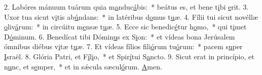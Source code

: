 2. Labóres mánuum tuárum quia m\uline{a}nduc\uline{á}bis:~* beátus es, et bene t\uline{i}bi \uline{e}rit.
3. Uxor tua sicut v\uline{i}tis ab\uline{ú}ndans:~* in latéribus d\uline{o}mus t\uline{u}æ.
4. Fílii tui sicut novéllæ \uline{o}liv\uline{á}rum:~* in circúitu m\uline{e}nsæ t\uline{u}æ.
5. Ecce sic benedic\uline{é}tur h\uline{o}mo,~* qui t\uline{i}met D\uline{ó}minum.
6. Benedícat tibi Dómin\uline{u}s ex S\uline{i}on:~* et vídeas bona Jerúsalem ómnibus diébus v\uline{i}tæ t\uline{u}æ.
7. Et vídeas fílios fili\uline{ó}rum tu\uline{ó}rum:~* pacem s\uline{u}per \uline{I}sraël.
8. Glória Patri, et F\uline{í}l\uline{i}o,~* et Spir\uline{í}tui S\uline{a}ncto.
9. Sicut erat in princípio, et n\uline{u}nc, et s\uline{e}mper,~* et in sǽcula sæcul\uline{ó}rum. \uline{A}men.
